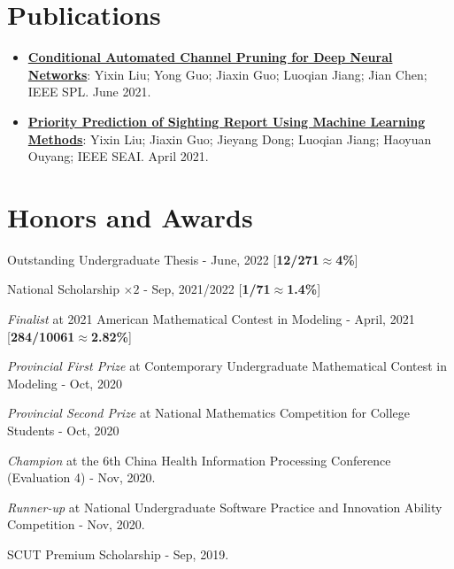 \documentclass[a4paper,20pt]{article}
\newcommand{\resumeItem}[2]{
  \item\small{
    \textbf{#1}{: #2 \vspace{-2pt}}
  }
}
\newcommand{\resumeSubItem}[2]{\resumeItem{#1}{#2}\vspace{-3pt}}
\newcommand{\resumeSubHeadingListStart}{\begin{itemize}[leftmargin=*]}
\newcommand{\resumeSubHeadingListEnd}{\end{itemize}}
\begin{document}
\vspace{-5pt}
\section{Publications}
\resumeSubHeadingListStart
\resumeSubItem{\href{https://ieeexplore.ieee.org/document/9453104}{Conditional Automated Channel Pruning for Deep Neural Networks}}{Yixin Liu; Yong Guo; Jiaxin Guo; Luoqian Jiang; Jian Chen; IEEE SPL. June 2021.}
\vspace{5pt}
\resumeSubItem{\href{https://ieeexplore.ieee.org/document/9477549}{Priority Prediction of Sighting Report Using Machine Learning Methods}}{Yixin Liu; Jiaxin Guo; Jieyang Dong; Luoqian Jiang; Haoyuan Ouyang; IEEE SEAI. April 2021.}
\resumeSubHeadingListEnd
\vspace{-5pt}

\section{Honors and Awards}
\begin{description}[font=$\bullet$]
\item {Outstanding Undergraduate Thesis - June, 2022 [\textbf{12/271$\approx$4\%}]}
\vspace{-2pt}
\item {National Scholarship $\times 2$ - Sep, 2021/2022 [\textbf{1/71$\approx$1.4\%}]}
\vspace{-2pt}
\item {\textit{Finalist} at 2021 American Mathematical Contest in Modeling - April, 2021 [\textbf{284/10061$\approx$2.82\%}]}
\vspace{-2pt}
\item {\textit{Provincial First Prize} at Contemporary Undergraduate Mathematical Contest in Modeling - Oct, 2020 }
\vspace{-2pt}
\item {\textit{Provincial Second Prize} at National Mathematics Competition for College Students - Oct, 2020 }
\vspace{-2pt}
\item {\textit{Champion} at the 6th China Health Information Processing Conference (Evaluation 4) - Nov, 2020.}
\vspace{-2pt}
\item {\textit{Runner-up} at National Undergraduate Software Practice and Innovation Ability Competition - Nov, 2020.}
\vspace{-2pt}
\item {SCUT Premium Scholarship - Sep, 2019.}
\end{description}
	  
\end{document}
